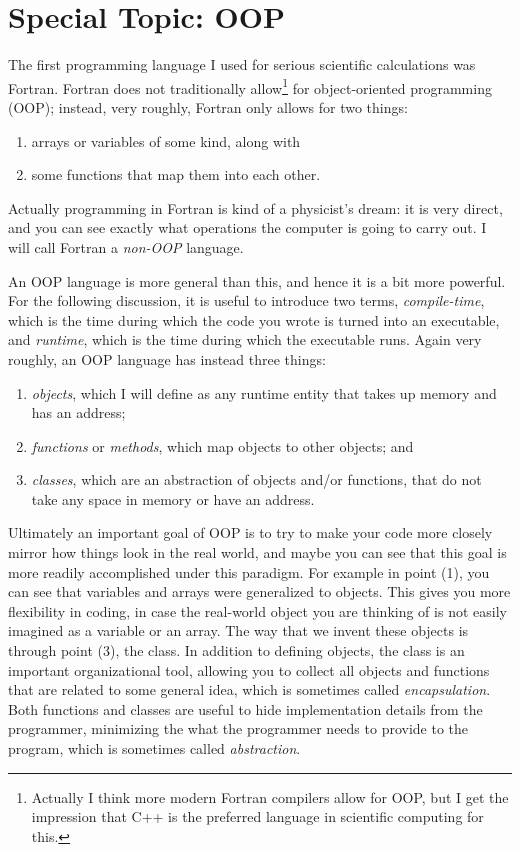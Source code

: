 \chapter{Special Topic: OOP}\label{ap:oop}

The first programming language I used for serious scientific calculations
was Fortran. Fortran does not traditionally 
allow\footnote{Actually I think more modern Fortran compilers 
allow for OOP, but I get the impression that C++ is the preferred language
in scientific computing for this.} for object-oriented programming (OOP); 
instead, very roughly, Fortran only
allows for two things:
\begin{enumerate}
  \item arrays or variables of some kind, along with 
  \item some functions that map them into each other.
\end{enumerate}
Actually programming in Fortran is kind
of a physicist's dream: it is very direct, and you can see exactly what
operations the computer is going to carry out. I will call Fortran
a {\it non-OOP} language.

An OOP language is more general than this, and hence it is a bit more powerful.
For the following discussion, it is useful to introduce two terms,
{\it compile-time}, which is the time during which the code you wrote
is turned into an executable, and {\it runtime}, which is the time during
which the executable runs.
Again very roughly, an OOP language has instead three things:
\begin{enumerate}
  \item {\it objects}, which I will define as any runtime entity that 
        takes up memory and has an address;
  \item {\it functions} or {\it methods}, which map objects to other
        objects; and
  \item {\it classes}, which are an abstraction of objects and/or functions,
        that do not take any space in memory or have an address.
\end{enumerate}

Ultimately an important goal of OOP is to try to make your code more closely
mirror how things look in the real world, and maybe you can see that this
goal is more readily accomplished under this paradigm.
For example in point (1), you can see that variables
and arrays were generalized to objects. This gives you more flexibility in
coding, in case the real-world object you are thinking of is not easily
imagined as a variable or an array. The way that we invent these objects
is through point (3), the class. In addition to defining objects, the
class is an important organizational tool, allowing you to collect all
objects and functions that are related to some general idea,
which is sometimes called 
{\it encapsulation}. Both functions and classes
are useful to hide implementation details from the programmer, minimizing
the what the programmer needs to provide to the program, which is
sometimes called {\it abstraction}.

